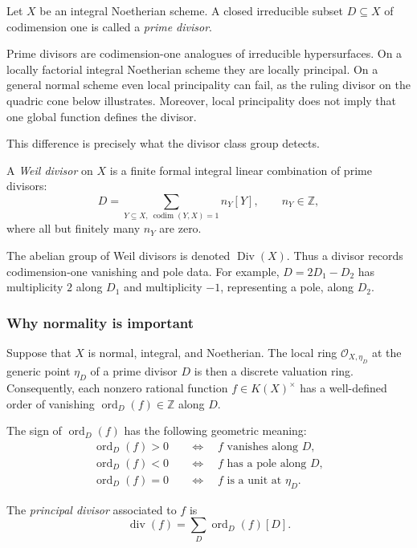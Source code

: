 Let \(X\) be an integral Noetherian scheme. A closed irreducible
subset \(D\subseteq X\) of codimension one is called a \emph{prime divisor}.

Prime divisors are codimension-one analogues of irreducible hypersurfaces.
On a locally factorial integral Noetherian scheme they are locally
principal. On a general normal scheme even local principality can fail,
as the ruling divisor on the quadric cone below illustrates. Moreover,
local principality does not imply that one global function defines the
divisor.

This difference is precisely what the divisor class group detects.

A \emph{Weil divisor} on \(X\) is a finite formal integral linear combination of prime divisors:
\[
D=\sum_{Y\subseteq X,\ \operatorname{codim}(Y,X)=1} n_Y[Y],
\qquad
n_Y\in \mathbb{Z},
\]
where all but finitely many \(n_Y\) are zero.

The abelian group of Weil divisors is denoted \(\operatorname{Div}(X)\).
Thus a divisor records codimension-one vanishing and pole data. For
example, \(D=2D_1-D_2\) has multiplicity \(2\) along \(D_1\) and
multiplicity \(-1\), representing a pole, along \(D_2\).

\subsubsection{Why normality is important}

Suppose that \(X\) is normal, integral, and Noetherian. The local ring
\(\mathcal{O}_{X,\eta_D}\) at the generic point \(\eta_D\) of a prime
divisor \(D\) is then a discrete valuation ring. Consequently, each
nonzero rational function \(f\in K(X)^\times\) has a well-defined
order of vanishing \(\operatorname{ord}_D(f)\in\mathbb Z\) along \(D\).

The sign of \(\operatorname{ord}_D(f)\) has the following geometric meaning:
\[
\begin{aligned}
\operatorname{ord}_D(f)>0&\quad\Longleftrightarrow\quad f\text{ vanishes along }D,\\
\operatorname{ord}_D(f)<0&\quad\Longleftrightarrow\quad f\text{ has a pole along }D,\\
\operatorname{ord}_D(f)=0&\quad\Longleftrightarrow\quad f\text{ is a unit at }\eta_D.
\end{aligned}
\]

The \emph{principal divisor} associated to \(f\) is
\[
\operatorname{div}(f)
=
\sum_D \operatorname{ord}_D(f)[D].
\]


